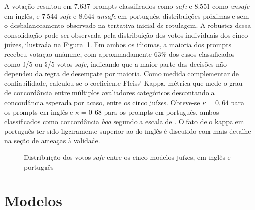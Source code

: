 A votação resultou em 7.637 prompts classificados como \textit{safe} e 8.551 como \textit{unsafe} em inglês, e 7.544 \textit{safe} e 8.644 \textit{unsafe} em português, distribuições próximas e sem o desbalanceamento observado na tentativa inicial de rotulagem. A robustez dessa consolidação pode ser observada pela distribuição dos votos individuais dos cinco juízes, ilustrada na Figura~\ref{fig:distribuicao-votos}. Em ambos os idiomas, a maioria dos prompts recebeu votação unânime, com aproximadamente 63\% dos casos classificados como 0/5 ou 5/5 votos \textit{safe}, indicando que a maior parte das decisões não dependeu da regra de desempate por maioria. Como medida complementar de confiabilidade, calculou-se o coeficiente Fleiss' Kappa, métrica que mede o grau de concordância entre múltiplos avaliadores categóricos descontando a concordância esperada por acaso, entre os cinco juízes. Obteve-se $\kappa = 0,64$ para os prompts em inglês e $\kappa = 0,68$ para os prompts em português, ambos classificados como concordância \textit{boa} segundo a escala de \citeauthor{landis1977}. O fato de o kappa em português ter sido ligeiramente superior ao do inglês é discutido com mais detalhe na seção de ameaças à validade.

\begin{figure}[htb]
	\centering
	\caption{Distribuição dos votos \textit{safe} entre os cinco modelos juízes, em inglês e português}
	\label{fig:distribuicao-votos}
\end{figure}

\section{Modelos}
\label{sec:modelos}

